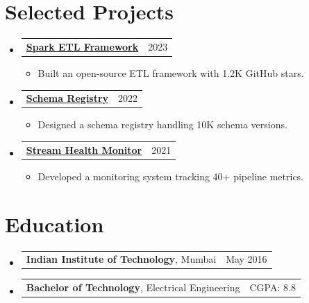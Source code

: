 \documentclass[letterpaper,11pt]{article}
\makeatletter
\newcommand{\resumeItem}[1]{%
  \item\small{#1 \vspace{-1pt}}%
}
\newcommand{\resumeSubheading}[3]{%
  \vspace{2pt}\item
    \begin{tabular*}{\linewidth}[t]{l@{\extracolsep{\fill}}r}
      \textbf{#1}, #2 & #3 \\
    \end{tabular*}\vspace{-4pt}%
}
\newcommand{\resumeProjectHeading}[2]{%
    \vspace{2pt}\item
    \begin{tabular*}{\linewidth}{l@{\extracolsep{\fill}}r}
      \small#1 & #2 \\
    \end{tabular*}\vspace{-4pt}%
}
\newcommand{\resumeSubHeadingListStart}{\begin{itemize}[leftmargin=0.15in, label={}, parsep=0pt, topsep=0pt, itemsep=4pt]}
\newcommand{\resumeSubHeadingListEnd}{\end{itemize}}
\newcommand{\resumeItemListStart}{\begin{itemize}[leftmargin=0.15in, parsep=0pt, topsep=2pt, itemsep=3pt, label=$\bullet$]}
\newcommand{\resumeItemListEnd}{\end{itemize}\vspace{-2pt}}
\makeatother
\begin{document}
\section{Selected Projects}
\resumeSubHeadingListStart
\resumeProjectHeading{\href{https://github.com/rohanmehta/spark-etl-framework}{\textbf{Spark ETL Framework}}}{2023}
\resumeItemListStart
\resumeItem{Built an open-source ETL framework with 1.2K GitHub stars.}
\resumeItemListEnd
\resumeProjectHeading{\href{https://github.com/rohanmehta/schema-registry}{\textbf{Schema Registry}}}{2022}
\resumeItemListStart
\resumeItem{Designed a schema registry handling 10K schema versions.}
\resumeItemListEnd
\resumeProjectHeading{\href{https://github.com/rohanmehta/stream-health}{\textbf{Stream Health Monitor}}}{2021}
\resumeItemListStart
\resumeItem{Developed a monitoring system tracking 40+ pipeline metrics.}
\resumeItemListEnd
\resumeSubHeadingListEnd

\section{Education}
\resumeSubHeadingListStart
\resumeSubheading{Indian Institute of Technology}{Mumbai}{May 2016}
\vspace{-15pt}
\resumeSubheading{Bachelor of Technology}{Electrical Engineering}{CGPA: 8.8}
\resumeSubHeadingListEnd
\end{document}

